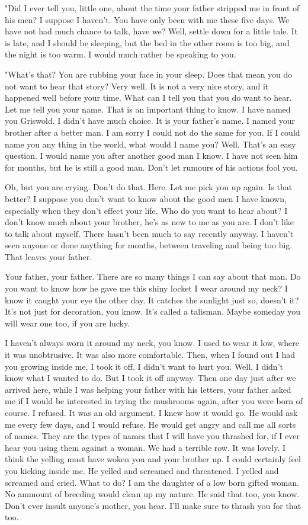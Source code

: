 \documentclass{article}
\begin{document}
"Did I ever tell you, little one, about the time your father stripped me in front of his men? I suppose I haven't. You have only been with me these five days. We have not had much chance to talk, have we? Well, settle down for a little tale. It is late, and I should be sleeping, but the bed in the other room is too big, and the night is too warm. I would much rather be speaking to you. 

"What's that? You are rubbing your face in your sleep. Does that mean you do not want to hear that story? Very well. It is not a very nice story, and it happened well before your time. What can I tell you that you do want to hear. Let me tell you your name. That is an important thing to know. I have named you Griswold. I didn't have much choice.  It is your father's name. I named your brother after a better man. I am sorry I could not do the same for you. If I could name you any thing in the world, what would I name you? Well. That's an easy question. I would name you after another good man I know. I have not seen him for months, but he is still a good man. Don't let rumours of his actions fool you. 

Oh, but you are crying. Don't do that. Here. Let me pick you up again. Is that better? I suppose you don't want to know about the good men I have known, especially when they don't effect your life. Who do you want to hear about? I don't know much about your brother, he's as new to me as you are. I don't like to talk about myself. There hasn't been much to say recently anyway. I haven't seen anyone or done anything for months, between traveling and being too big. That leaves your father. 

Your father, your father. There are so many things I can say about that man. Do you want to know how he gave me this shiny locket I wear around my neck? I know it caught your eye the other day. It catches the sunlight just so, doesn't it? It's not just for decoration, you know. It's called a talisman. Maybe someday you will wear one too, if you are lucky. 

I haven't always worn it around my neck, you know. I used to wear it low, where it was unobtrusive. It was also more comfortable. Then, when I found out I had you growing inside me, I took it off. I didn't want to hurt you. Well, I didn't know what I wanted to do. But I took it off anyway. Then one day just after we arrived here, while I was helping your father with his letters, your father asked me if I would be interested in trying the mushrooms again, after you were born of course. I refused. It was an old argument. I knew how it would go. He would ask me every few days, and I would refuse. He would get angry and call me all sorts of names. They are the types of names that I will have you thrashed for, if I ever hear you using them against a woman. We had a terrible row. It was lovely. I think the yelling must have woken you and your brother up. I could certainly feel you kicking inside me. He yelled and screamed and threatened. I yelled and screamed and cried. What to do? I am the daughter of a low born gifted woman. No ammount of breeding would clean up my nature. He said that too, you know. Don't ever insult anyone's mother, you hear. I'll make sure to thrash you for that too. 
\end{document}
